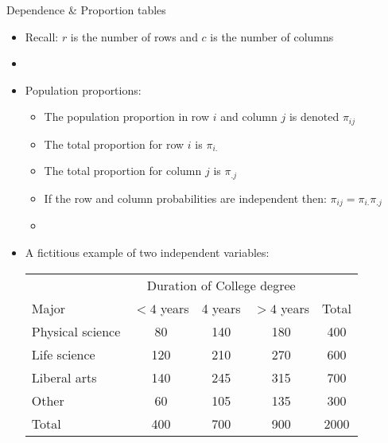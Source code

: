 \documentclass[xcolor=dvipsnames]{beamer}
\begin{document}
\begin{frame}{Dependence \& Proportion tables}
\begin{itemize}
	\item Recall: $r$ is the number of rows and $c$ is the number of columns
	\item[]
	\item Population proportions:
	\begin{itemize}
		\item The population proportion in row $i$ and column $j$ is denoted $\pi_{ij}$
		\item The total proportion for row $i$ is $\pi_{i.}$
		\item The total proportion for column $j$ is $\pi_{.j}$
		\item If the row and column probabilities are independent then: $\pi_{ij}=\pi_{i.}\pi_{.j}$
		\item[]
	\end{itemize}
	\item A fictitious example of two independent variables:
	\begin{center}
		\begin{tabular}{|l|ccc|c|}
			\hline
			& \multicolumn{3}{c|}{Duration of College degree} & \\
			Major & $<4$ years & 4 years & $>4$ years & Total \\ \hline
			Physical science & 80 & 140 & 180 & 400 \\ 
			Life science & 120 & 210 & 270 & 600 \\
			Liberal arts & 140 & 245 & 315 & 700\\ 
			Other & 60 & 105 & 135 & 300 \\ \hline
			Total & 400 & 700 & 900 & 2000\\ \hline
		\end{tabular}
	\end{center}
\end{itemize}
\end{frame}
\end{document}
